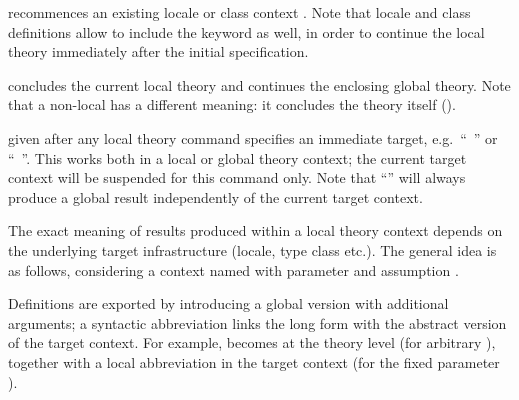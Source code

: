 \begin{isabellebody}
\begin{isamarkuptext}
  \begin{descr}
  
  \item [\mbox{\isa{\isacommand{context}}}~\isa{c\ {\isasymBEGIN}}] recommences an
  existing locale or class context .  Note that locale and
  class definitions allow to include the \mbox{}
  keyword as well, in order to continue the local theory immediately
  after the initial specification.
  
  \item [\mbox{\isa{\isacommand{end}}}] concludes the current local theory and
  continues the enclosing global theory.  Note that a non-local
  \mbox{} has a different meaning: it concludes the theory
  itself ().
  
  \item [\isa{{\isacharparenleft}{\isasymIN}\ c{\isacharparenright}}] given after any local theory command
  specifies an immediate target, e.g.\ ``\mbox{}~'' or ``\mbox{}~''.  This works both in a local or
  global theory context; the current target context will be suspended
  for this command only.  Note that ``\isa{{\isacharparenleft}{\isasymIN}\ {\isacharminus}{\isacharparenright}}'' will
  always produce a global result independently of the current target
  context.

  \end{descr}

  The exact meaning of results produced within a local theory context
  depends on the underlying target infrastructure (locale, type class
  etc.).  The general idea is as follows, considering a context named
   with parameter  and assumption .
  
  Definitions are exported by introducing a global version with
  additional arguments; a syntactic abbreviation links the long form
  with the abstract version of the target context.  For example,
   becomes  at the theory
  level (for arbitrary ), together with a local
  abbreviation  in the target context (for the
  fixed parameter ).


\end{isamarkuptext}
\end{isabellebody}
